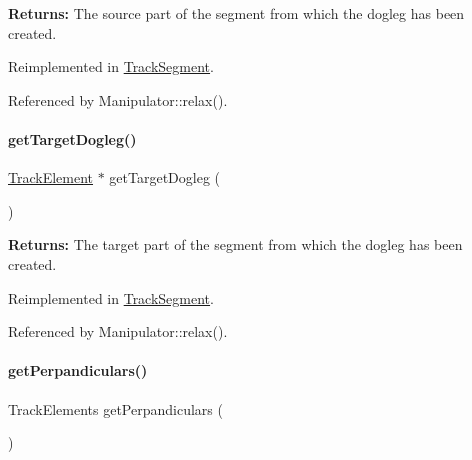 {\bfseries Returns\+:} The source part of the segment from which the dogleg has been created. 

Reimplemented in \mbox{\hyperlink{classKite_1_1TrackSegment_a7e79fbfe77f173d46b1959c41087930a}{Track\+Segment}}.



Referenced by Manipulator\+::relax().

\mbox{\label{classKite_1_1TrackElement_aeb4e39bd925d093e6c45599433bb421c}} 
\paragraph{\texorpdfstring{get\+Target\+Dogleg()}{getTargetDogleg()}}
{\footnotesize\ttfamily \mbox{\hyperlink{classKite_1_1TrackElement}{Track\+Element}} $\ast$ get\+Target\+Dogleg (\begin{DoxyParamCaption}{ }\end{DoxyParamCaption})\hspace{0.3cm}{\ttfamily [virtual]}}

{\bfseries Returns\+:} The target part of the segment from which the dogleg has been created. 

Reimplemented in \mbox{\hyperlink{classKite_1_1TrackSegment_aeb4e39bd925d093e6c45599433bb421c}{Track\+Segment}}.



Referenced by Manipulator\+::relax().

\mbox{\label{classKite_1_1TrackElement_aa0ba92ebf19f596537dc051c090d5736}} 
\paragraph{\texorpdfstring{get\+Perpandiculars()}{getPerpandiculars()}}
{\footnotesize\ttfamily Track\+Elements get\+Perpandiculars (\begin{DoxyParamCaption}{ }\end{DoxyParamCaption})\hspace{0.3cm}{\ttfamily [virtual]}}

